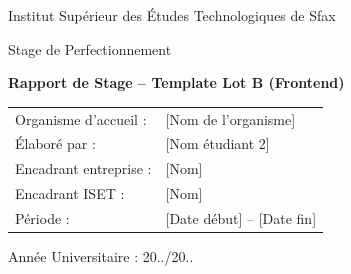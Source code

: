 \begin{titlepage}
\centering
{\Large Institut Supérieur des Études Technologiques de Sfax\par}
\vspace{0.8cm}
{\large Stage de Perfectionnement\par}
\vspace{1.2cm}
{\LARGE \textbf{Rapport de Stage -- Template Lot B (Frontend)}\par}
\vspace{1.2cm}
\begin{tabular}{ll}
Organisme d'accueil : & [Nom de l'organisme] \\
Élaboré par : & [Nom étudiant 2] \\
Encadrant entreprise : & [Nom] \\
Encadrant ISET : & [Nom] \\
Période : & [Date début] -- [Date fin]
\end{tabular}
\vfill
Année Universitaire : 20../20..
\end{titlepage}
